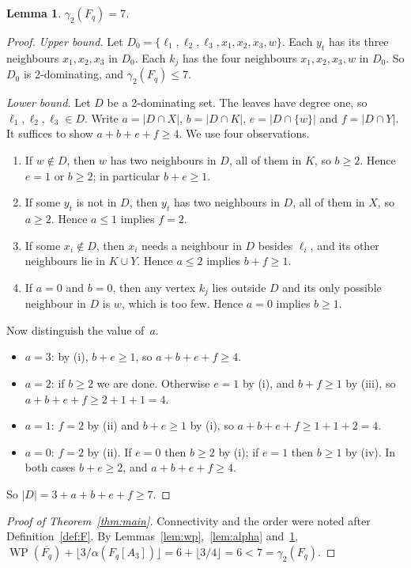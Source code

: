 \documentclass[11pt,a4paper]{article}
\newtheorem{lemma}[theorem]{Lemma}
\theoremstyle{definition}
\theoremstyle{remark}
\newcommand{\WP}{\operatorname{WP}}
\newcommand{\flr}[1]{\lfloor #1\rfloor}
\begin{document}
\begin{lemma}\label{lem:gamma}
$\gamma_2(F_q)=7$.
\end{lemma}

\begin{proof}
\emph{Upper bound.} Let $D_0=\{\ell_1,\ell_2,\ell_3,x_1,x_2,x_3,w\}$. Each $y_t$ has its three
neighbours $x_1,x_2,x_3$ in $D_0$. Each $k_j$ has the four neighbours $x_1,x_2,x_3,w$ in $D_0$. So
$D_0$ is 2-dominating, and $\gamma_2(F_q)\le 7$.

\emph{Lower bound.} Let $D$ be a 2-dominating set. The leaves have degree one, so
$\ell_1,\ell_2,\ell_3\in D$. Write $a=|D\cap X|$, $b=|D\cap K|$, $e=|D\cap\{w\}|$ and $f=|D\cap Y|$.
It suffices to show $a+b+e+f\ge 4$. We use four observations.
\begin{enumerate}
\item[(i)] If $w\notin D$, then $w$ has two neighbours in $D$, all of them in $K$, so $b\ge 2$.
Hence $e=1$ or $b\ge 2$; in particular $b+e\ge 1$.
\item[(ii)] If some $y_t$ is not in $D$, then $y_t$ has two neighbours in $D$, all of them in $X$, so
$a\ge 2$.
Hence $a\le 1$ implies $f=2$.
\item[(iii)] If some $x_i\notin D$, then $x_i$ needs a neighbour in $D$ besides $\ell_i$, and its
other neighbours lie in $K\cup Y$. Hence $a\le 2$ implies $b+f\ge 1$.
\item[(iv)] If $a=0$ and $b=0$, then any vertex $k_j$ lies outside $D$ and its only possible
neighbour in $D$ is $w$, which is too few. Hence $a=0$ implies $b\ge 1$.
\end{enumerate}
Now distinguish the value of~$a$.
\begin{itemize}
\item $a=3$: by (i), $b+e\ge 1$, so $a+b+e+f\ge 4$.
\item $a=2$: if $b\ge 2$ we are done. Otherwise $e=1$ by (i), and $b+f\ge 1$ by (iii), so
$a+b+e+f\ge 2+1+1=4$.
\item $a=1$: $f=2$ by (ii) and $b+e\ge 1$ by (i), so $a+b+e+f\ge 1+1+2=4$.
\item $a=0$: $f=2$ by (ii). If $e=0$ then $b\ge 2$ by (i); if $e=1$ then $b\ge 1$ by (iv). In both
cases $b+e\ge 2$, and $a+b+e+f\ge 4$.
\end{itemize}
So $|D|=3+a+b+e+f\ge 7$.
\end{proof}

\begin{proof}[Proof of Theorem~\ref{thm:main}]
Connectivity and the order were noted after Definition~\ref{def:F}. By
Lemmas~\ref{lem:wp},~\ref{lem:alpha} and~\ref{lem:gamma},
$\WP(\overline{F_q})+\flr{3/\alpha(F_q[A_3])}=6+\flr{3/4}=6<7=\gamma_2(F_q)$.
\end{proof}
\end{document}
